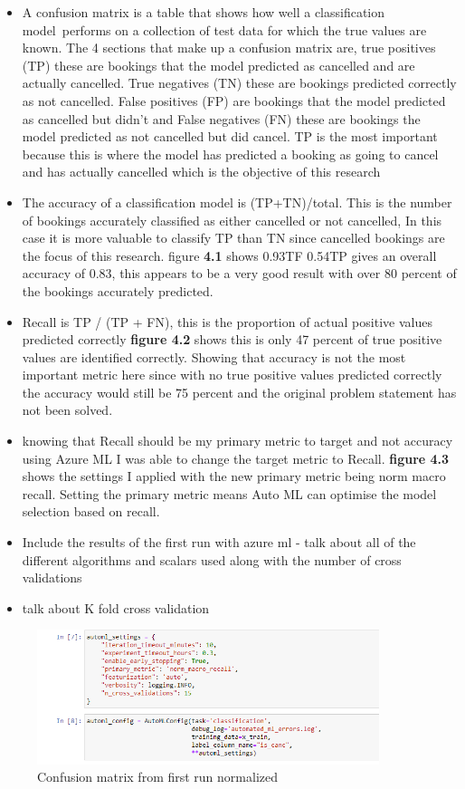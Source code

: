 \begin{itemize}
\item A confusion matrix is a table that shows how well a classification model performs on a collection of test data for which the true values are known. The 4 sections that make up a confusion matrix are, true positives (TP) these are bookings that the model predicted as cancelled and are actually cancelled. True negatives (TN) these are bookings predicted correctly as not cancelled. False positives (FP) are bookings that the model predicted as cancelled but didn't and False negatives (FN) these are bookings the model predicted as not cancelled but did cancel. TP is the most important because this is where the model has predicted a booking as going  to cancel and has actually cancelled which is the objective of this research
\item  The accuracy of a classification model is (TP+TN)/total. This is the number of bookings accurately classified as either cancelled or not cancelled, In this case it is more valuable to classify TP than TN since cancelled bookings are the focus of this research. figure \textbf{4.1} shows  0.93TF 0.54TP gives an overall accuracy of 0.83, this appears to be a very good result with over 80 percent of the bookings accurately predicted.
\item Recall is TP / (TP + FN), this is the proportion of actual positive values predicted correctly \textbf{figure 4.2} shows this is only 47 percent of true positive values are identified correctly. Showing that accuracy is not the most important metric here since with no true positive values predicted correctly the accuracy would still be 75 percent and the original problem statement has not been solved. 
\item knowing that Recall should be my primary metric to target and not accuracy using Azure ML I was able to change the target metric to Recall. \textbf{figure 4.3} shows the settings I applied with the new primary metric being norm macro recall. Setting the primary metric means Auto ML can optimise the model selection based on recall.
\item Include the results of the first run with azure ml - talk about all of the different algorithms and scalars used along with the number of cross validations
\item talk about K fold cross validation
\end{itemize}


\begin{figure}[hbt!]
 \includegraphics[width=10cm]{figures/auto_ml_settings.png}
 \caption{Confusion matrix from first run normalized}
\end{figure}


